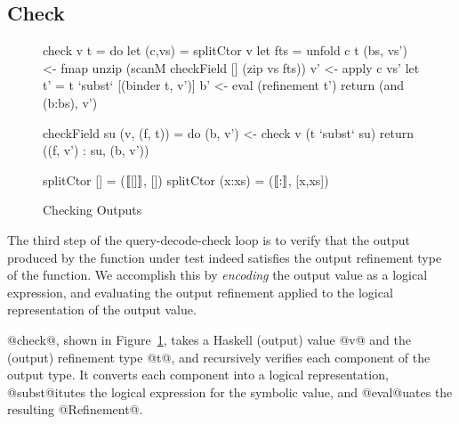 \subsection{Check}\label{sec:encode}\label{sec:check}
%
\begin{figure}[t!]
\begin{mdframed}
\begin{CenteredBox}
\begin{mcode}
check v t = do
  let (c,vs) = splitCtor v
  let fts    = unfold c t
  (bs, vs') <- fmap unzip (scanM checkField [] (zip vs fts))
  v'        <- apply c vs'
  let t'     = t `subst` [(binder t, v')]
  b'        <- eval (refinement t')
  return (and (b:bs), v')
  
checkField su (v, (f, t)) = do
  (b, v') <- check v (t `subst` su)
  return ((f, v') : su, (b, v'))

splitCtor []     = ($[\![[]]\!]$, [])
splitCtor (x:xs) = ($[\![:]\!]$, [x,xs])
\end{mcode}
\end{CenteredBox}
\end{mdframed}
\caption{Checking Outputs}\label{fig:check}
\end{figure}
%
The third step of the query-decode-check loop is to verify
that the output produced by the function under test indeed
satisfies the output refinement type of the function.
%
We accomplish this by \emph{encoding} the output value as a
logical expression, and evaluating the output refinement
applied to the logical representation of the output value.

@check@, shown in Figure~\ref{fig:check}, takes a Haskell
(output) value @v@ and the (output) refinement type @t@, and
recursively verifies each component of the output type. It
converts each component into a logical representation,
@subst@itutes the logical expression for the symbolic value,
and @eval@uates the resulting @Refinement@.



